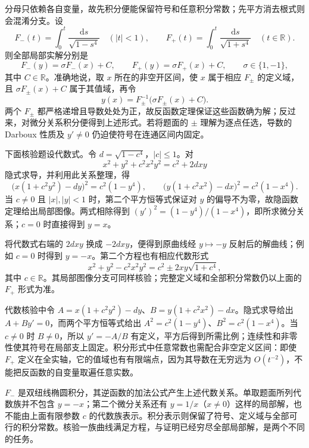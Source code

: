 \documentclass[UTF8,12pt,a4paper,fontset=fandol]{ctexart}
\begin{document}
\begin{solve}\label{ans:fin16-low:10}

分母只依赖各自变量，故先积分便能保留符号和任意积分常数；先平方消去根式则会混淆分支。设
\[
F_-(t)=\int_0^t\frac{\mathrm ds}{\sqrt{1-s^4}}\quad(|t|<1),
\qquad
F_+(t)=\int_0^t\frac{\mathrm ds}{\sqrt{1+s^4}}\quad(t\in\mathbb R).
\]
则全部局部实解分别是
\[
\boxed{F_-(y)=\sigma F_-(x)+C},\qquad
\boxed{F_+(y)=\sigma F_+(x)+C},\qquad\sigma\in\{1,-1\},
\]
其中 $C\in\mathbb R$。准确地说，取 $x$ 所在的非空开区间，使 $x$ 属于相应 $F_\pm$ 的定义域，且 $\sigma F_\pm(x)+C$ 属于其值域，再令
\[
y(x)=F_\pm^{-1}\bigl(\sigma F_\pm(x)+C\bigr).
\]
两个 $F_\pm$ 都严格递增且导数处处为正，故反函数定理保证这些函数确为解；反过来，对微分关系积分便得到上述形式。若将题面的 $\pm$ 理解为逐点任选，导数的 Darboux 性质及 $y'\ne0$ 仍迫使符号在连通区间内固定。

下面核验题设代数式。令 $d=\sqrt{1-c^4}$，$|c|\le1$。对
\[
x^2+y^2+c^2x^2y^2=c^2+2dxy
\]
隐式求导，并利用此关系整理，得
\[
\bigl(x(1+c^2y^2)-dy\bigr)^2=c^2(1-y^4),\qquad
\bigl(y(1+c^2x^2)-dx\bigr)^2=c^2(1-x^4).
\]
当 $c\ne0$ 且 $|x|,|y|<1$ 时，第二个平方恒等式保证对 $y$ 的偏导不为零，故隐函数定理给出局部图像。两式相除得到 $(y')^2=(1-y^4)/(1-x^4)$，即所求微分关系；$c=0$ 时直接得到 $y=x$。

将代数式右端的 $2dxy$ 换成 $-2dxy$，便得到原曲线经 $y\mapsto-y$ 反射后的解曲线；例如 $c=0$ 时得到 $y=-x$。第二个方程也有相应代数形式
\[
x^2+y^2-c^2x^2y^2=c^2\pm2xy\sqrt{1+c^4},
\]
其中 $c\in\mathbb R$。其局部图像分支可同样核验；完整定义域和全部积分常数仍以上面的 $F_+$ 形式为准。

代数核验中令 $A=x(1+c^2y^2)-dy$、$B=y(1+c^2x^2)-dx$。隐式求导给出 $A+By'=0$，而两个平方恒等式给出 $A^2=c^2(1-y^4)$、$B^2=c^2(1-x^4)$。当 $c\ne0$ 时 $B\ne0$，所以 $y'=-A/B$ 有定义，平方后得到所需比例；连续性和非零性使其符号在局部支上固定。积分形式中任意常数也需配合非空定义区间：即使 $F_+$ 定义在全实轴，它的值域也有有限端点，因为其导数在无穷远为 $O(t^{-2})$，不能把反函数的自变量取遍任意实数。

\end{solve}

\begin{remark}[方法与条件]$F_-$ 是双纽线椭圆积分，其逆函数的加法公式产生上述代数关系。单取题面所列代数族并不包含 $y=-x$；第二个微分关系还有 $y=1/x$（$x\ne0$）这样的局部解，也不能由上面有限参数 $c$ 的代数族表示。积分表示则保留了符号、定义域与全部可行的积分常数。核验一族曲线满足方程，与证明已经穷尽全部局部解，是两个不同的任务。\end{remark}
\end{document}
